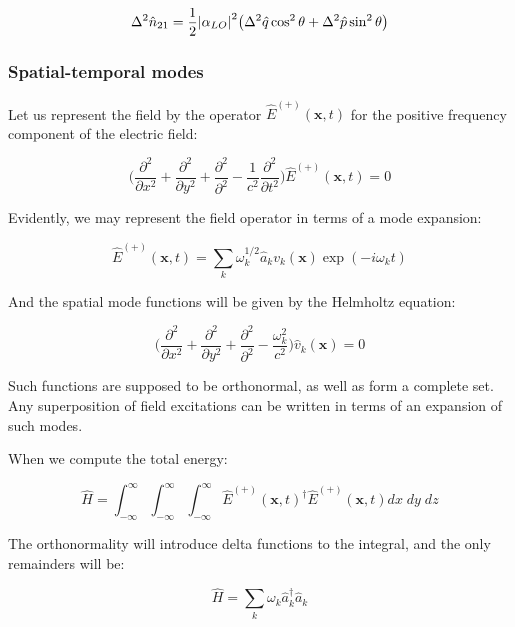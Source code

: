 \documentclass[12pt,a4paper]{report}
\begin{document}
\begin{equation}
    \Delta^2\hat n_{21}=\frac{1}{2}\abs{\alpha_{LO}}^2\big(\Delta^2\hat q \cos^2\theta+\Delta^2\hat p \sin^2\theta\big)
\end{equation}

\subsubsection{Spatial-temporal modes}

Let us represent the field by the operator $\hat E^{(+)}(\textbf{x},t)$ for the positive frequency component of the electric field:

\begin{equation}
    \Big( \frac{\partial^2}{\partial x^2}+\frac{\partial^2}{\partial y^2}+\frac{\partial^2}{\partial ^2}-\frac{1}{c^2}\frac{\partial^2}{\partial t^2}\Big)\hat E^{(+)}(\textbf{x},t)=0
\end{equation}

Evidently, we may represent the field operator in terms of a mode expansion:

\begin{equation}
    \hat E^{(+)}(\textbf{x},t)=\sum_{k}\omega_k^{1/2}\hat a_k v_k(\textbf{x})\exp(-i\omega_kt)
\end{equation}

And the spatial mode functions will be given by the Helmholtz equation:

\begin{equation}
    \Big( \frac{\partial^2}{\partial x^2}+\frac{\partial^2}{\partial y^2}+\frac{\partial^2}{\partial ^2}-\frac{\omega_k^2}{c^2}\Big)\hat v_k(\textbf{x})=0
\end{equation}

Such functions are supposed to be orthonormal, as well as form a complete set. Any superposition of field excitations can be written in terms of an expansion of such modes.

When we compute the total energy:

\begin{equation}
    \hat H=\int_{-\infty}^{\infty}\int_{-\infty}^{\infty}\int_{-\infty}^{\infty}\hat E^{(+)}(\textbf{x},t)^{\dag}\hat E^{(+)}(\textbf{x},t)dx\;dy\;dz
\end{equation}

The orthonormality will introduce delta functions to the integral, and the only remainders will be:

\begin{equation}
    \hat H=\sum_{k}\omega_k\hat a_k^{\dag}\hat a_{k}
\end{equation}
\end{document}
